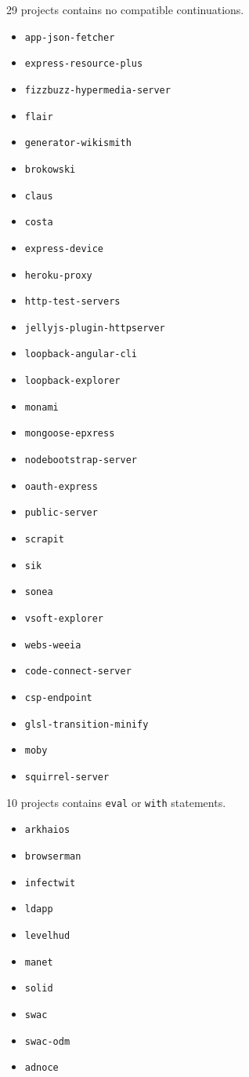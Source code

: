 29 projects contains no compatible continuations.
\begin{itemize}
\item \texttt{app-json-fetcher}
\item \texttt{express-resource-plus}
\item \texttt{fizzbuzz-hypermedia-server}
\item \texttt{flair}
\item \texttt{generator-wikismith}
\item \texttt{brokowski}
\item \texttt{claus}
\item \texttt{costa}
\item \texttt{express-device}
\item \texttt{heroku-proxy}
\item \texttt{http-test-servers}
\item \texttt{jellyjs-plugin-httpserver}
\item \texttt{loopback-angular-cli}
\item \texttt{loopback-explorer}
\item \texttt{monami}
\item \texttt{mongoose-epxress}
\item \texttt{nodebootstrap-server}
\item \texttt{oauth-express}
\item \texttt{public-server}
\item \texttt{scrapit}
\item \texttt{sik}
\item \texttt{sonea}
\item \texttt{vsoft-explorer}
\item \texttt{webs-weeia}
\item \texttt{code-connect-server}
\item \texttt{csp-endpoint}
\item \texttt{glsl-transition-minify}
\item \texttt{moby}
\item \texttt{squirrel-server}
\end{itemize}

10 projects contains \texttt{eval} or \texttt{with} statements.
\begin{itemize}
\item \texttt{arkhaios}
\item \texttt{browserman}
\item \texttt{infectwit}
\item \texttt{ldapp}
\item \texttt{levelhud}
\item \texttt{manet}
\item \texttt{solid}
\item \texttt{swac}
\item \texttt{swac-odm}
\item \texttt{adnoce}
\end{itemize}


